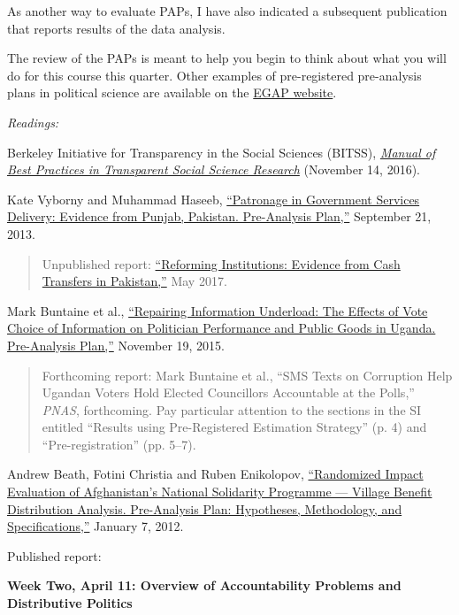 \documentclass[11pt]{article}
\begin{document}
As another way to evaluate PAPs, I have also indicated a subsequent publication that reports results of the data analysis.

The review of the PAPs is meant to help you begin to think about what you will do for this course this quarter. 
Other examples of pre-registered pre-analysis plans in political science are available  
on the \href{http://egap.org/content/registration}{EGAP website}.


\textit{Readings:}


Berkeley Initiative for Transparency in the Social Sciences (BITSS),
\href{http://www.bitss.org/education/manual-of-best-practices/}{\emph{Manual of Best Practices in Transparent Social Science Research}} (November 14, 2016). 

Kate Vyborny and Muhammad Haseeb, \href{http://egap.org/registration/632}{``Patronage in Government Services Delivery: Evidence from Punjab, Pakistan. Pre-Analysis Plan,''} September 21, 2013.

\begin{quote}
Unpublished report: \href{https://docs.google.com/viewer?a=v&pid=sites&srcid=ZGVmYXVsdGRvbWFpbnxrdnlib3JueXxneDo1ZjRiMmYyNDgxMmJlMzQ4}{``Reforming Institutions: Evidence from Cash Transfers in Pakistan,''} May 2017.
\end{quote}

Mark Buntaine et al., \href{http://egap.org/registration/1615}{``Repairing Information Underload: The Effects of Vote Choice of Information on Politician Performance and Public Goods in Uganda. Pre-Analysis Plan,''} November 19, 2015.

\begin{quote}
Forthcoming report: Mark Buntaine et al., ``SMS Texts on Corruption Help Ugandan Voters Hold Elected Councillors Accountable at the Polls,'' \textit{PNAS}, forthcoming. Pay particular attention to the sections in the SI entitled ``Results using Pre-Registered Estimation Strategy'' (p. 4) and ``Pre-registration'' (pp. 5--7). 
\end{quote}

Andrew Beath, Fotini Christia and Ruben Enikolopov, \href{http://egap.org/registration/603}{``Randomized Impact Evaluation of Afghanistan's National Solidarity Programme --- Village Benefit Distribution Analysis. Pre-Analysis Plan: Hypotheses, Methodology, and Specifications,''} January 7, 2012.

Published report: 

\textbf{Week Two, April 11: Overview of Accountability Problems and Distributive Politics}
\end{document}
